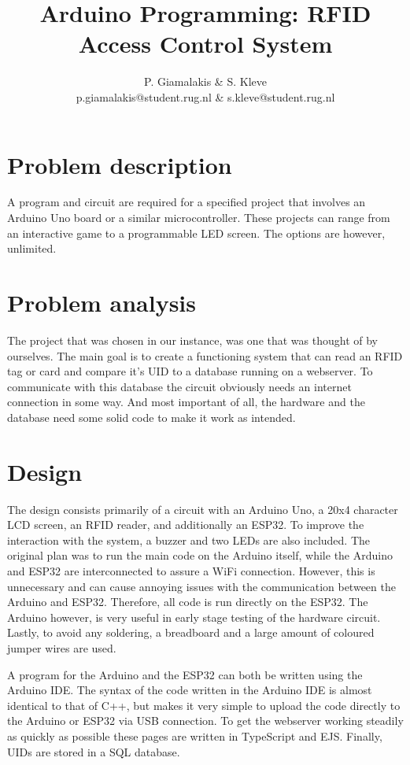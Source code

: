 \documentclass[a4paper,10pt]{article}
\title{Arduino Programming: RFID Access Control System}
\author{P. Giamalakis \& S. Kleve\\
        p.giamalakis@student.rug.nl \& s.kleve@student.rug.nl}
\begin{document}
\maketitle

\section{Problem description}
 A program and circuit are required for a specified project that involves an Arduino Uno board or a similar microcontroller.  These projects can range from an interactive game to a programmable LED screen. The options are however, unlimited.

\section{Problem analysis}
The project that was chosen in our instance, was one that was thought of by ourselves. The main goal is to create a functioning system that can read an RFID tag or card and compare it's UID to a database running on a webserver. To communicate with this database the circuit obviously needs an internet connection in some way. And most important of all, the hardware and the database need some solid code to make it work as intended.

\section{Design}
The design consists primarily of a circuit with an Arduino Uno, a 20x4 character LCD screen, an RFID reader, and additionally an ESP32. To improve the interaction with the system, a buzzer and two LEDs are also included. The original plan was to run the main code on the Arduino itself, while the Arduino and ESP32 are interconnected to assure a WiFi connection. However, this is unnecessary and can cause annoying issues with the communication between the Arduino and ESP32. Therefore, all code is run directly on the ESP32. The Arduino however, is very useful in early stage testing of the hardware circuit. Lastly, to avoid any soldering, a breadboard and a large amount of coloured jumper wires are used.

A program for the Arduino and the ESP32 can both be written using the Arduino IDE. The syntax of the code written in the Arduino IDE is almost identical to that of C++, but makes it very simple to upload the code directly to the Arduino or ESP32 via USB connection. To get the webserver working steadily as quickly as possible these pages are written in TypeScript and EJS. Finally, UIDs are stored in a SQL database.  
\end{document}
